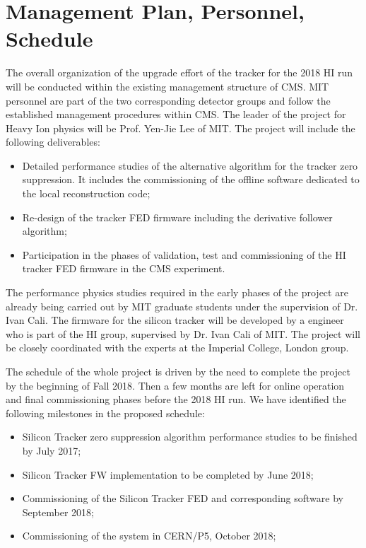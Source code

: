 \section{Management Plan, Personnel, Schedule}
\label{sec:management}

The overall organization of the upgrade effort of the tracker%
for the 2018 HI run will be conducted within the existing management structure of CMS. MIT personnel are part of the two corresponding detector groups and follow the established management procedures within CMS. The leader of the project for Heavy Ion physics will be Prof. Yen-Jie Lee of MIT. The project will include the following deliverables:

\begin{itemize}
\item Detailed performance studies of the alternative algorithm for the tracker zero suppression. It includes the commissioning of the offline software dedicated to the local reconstruction code;
\item Re-design of the tracker FED firmware including the derivative follower algorithm;
\item Participation in the phases of validation, test and commissioning of the HI tracker FED firmware in the CMS experiment.
\end{itemize}

The performance physics studies required in the early phases of the project are already being carried out by MIT graduate students under the supervision of Dr. Ivan Cali. The firmware for the silicon tracker will be developed by a engineer who is part of the HI group, supervised by Dr. Ivan Cali of MIT. The project will be closely coordinated with the experts at the Imperial College, London group.

The schedule of the whole project is driven by the need to complete the project by the beginning of Fall 2018. Then a few months are left for online operation and final commissioning phases before the 2018 HI run. We have identified the following milestones in the proposed schedule:

\begin{itemize}
\item Silicon Tracker zero suppression algorithm performance studies to be finished by July 2017;
\item Silicon Tracker FW implementation to be completed by June 2018;
\item Commissioning of the Silicon Tracker FED and corresponding software by September 2018;
\item Commissioning of the system in CERN/P5, October 2018;
\end{itemize}
